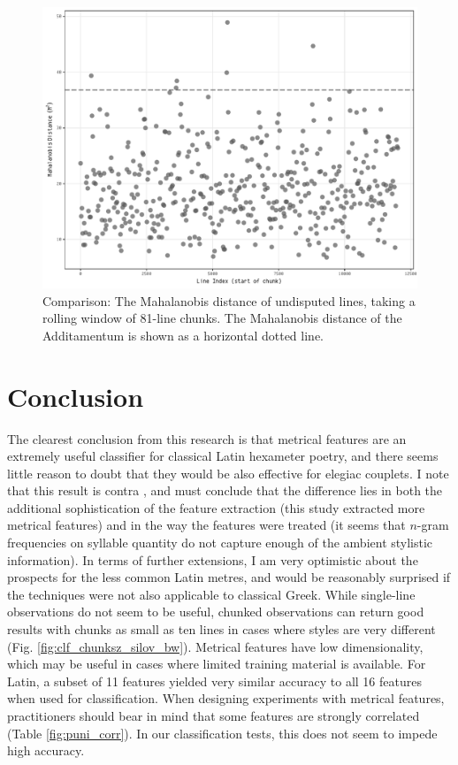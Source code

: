 \documentclass[11pt,a4paper]{scrartcl} %
\begin{document}
{\begin{figure}[h]
    \caption{Comparison: The Mahalanobis distance of undisputed lines, taking a rolling window of 81-line chunks. The Mahalanobis distance of the Additamentum is shown as a horizontal dotted line.}
    \label{fig:rolling_weirdness}
    \includegraphics[width=\textwidth]{rolling_weirdness_bw.pdf}
\end{figure}

\section{Conclusion}
The clearest conclusion from this research is that metrical features are an extremely useful classifier for classical Latin hexameter poetry, and there seems little reason to doubt that they would be also effective for elegiac couplets. I note that this result is contra , and must conclude that the difference lies in both the additional sophistication of the feature extraction (this study extracted more metrical features) and in the way the features were treated (it seems that $n$-gram frequencies on syllable quantity do not capture enough of the ambient stylistic information). In terms of further extensions, I am very optimistic about the prospects for the less common Latin metres, and would be reasonably surprised if the techniques were not also applicable to classical Greek. While single-line observations do not seem to be useful, chunked observations can return good results with chunks as small as ten lines in cases where styles are very different (Fig. \ref{fig:clf_chunksz_silov_bw}). Metrical features have low dimensionality, which may be useful in cases where limited training material is available. For Latin, a subset of 11 features yielded very similar accuracy to all 16 features when used for classification. When designing experiments with metrical features, practitioners should bear in mind that some features are strongly correlated (Table \ref{fig:puni_corr}). In our classification tests, this does not seem to impede high accuracy.

}
\end{document}
